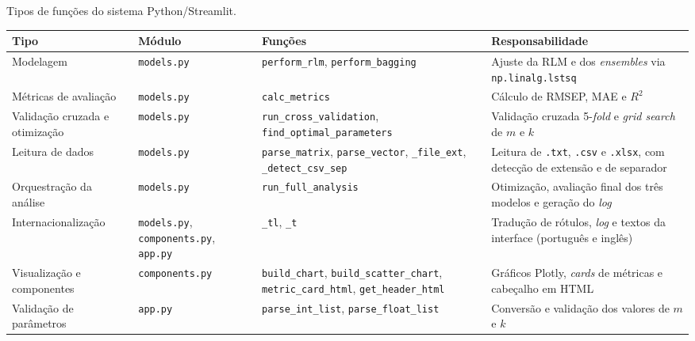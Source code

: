 \begin{quadro}[ht]
\begin{center}
\footnotesize
\captionsetup{justification=centering, labelsep=endash, width=0.75\linewidth}
\caption{Tipos de funções do sistema Python/Streamlit.}
\label{tab:tipos_python}
\begin{threeparttable}
\renewcommand{\arraystretch}{1.15}
\begin{tabularx}{\textwidth}{|>{\raggedright\arraybackslash}p{2.8cm}|>{\raggedright\arraybackslash}p{2.4cm}|>{\raggedright\arraybackslash}X|>{\raggedright\arraybackslash}X|}
\hline
\textbf{Tipo} & \textbf{Módulo} & \textbf{Funções} & \textbf{Responsabilidade} \\ \hline
Modelagem & \texttt{models.py} & \texttt{perform\_rlm}, \texttt{perform\_bagging} & Ajuste da RLM e dos \textit{ensembles} via \texttt{np.linalg.lstsq} \\ \hline
Métricas de avaliação & \texttt{models.py} & \texttt{calc\_metrics} & Cálculo de RMSEP, MAE e $R^2$ \\ \hline
Validação cruzada e otimização & \texttt{models.py} & \texttt{run\_cross\_validation}, \texttt{find\_optimal\_parameters} & Validação cruzada 5-\textit{fold} e \textit{grid search} de $m$ e $k$ \\ \hline
Leitura de dados & \texttt{models.py} & \texttt{parse\_matrix}, \texttt{parse\_vector}, \texttt{\_file\_ext}, \texttt{\_detect\_csv\_sep} & Leitura de \texttt{.txt}, \texttt{.csv} e \texttt{.xlsx}, com detecção de extensão e de separador \\ \hline
Orquestração da análise & \texttt{models.py} & \texttt{run\_full\_analysis} & Otimização, avaliação final dos três modelos e geração do \textit{log} \\ \hline
Internacionalização & \texttt{models.py}, \texttt{components.py}, \texttt{app.py} & \texttt{\_tl}, \texttt{\_t} & Tradução de rótulos, \textit{log} e textos da interface (português e inglês) \\ \hline
Visualização e componentes & \texttt{components.py} & \texttt{build\_chart}, \texttt{build\_scatter\_chart}, \texttt{metric\_card\_html}, \texttt{get\_header\_html} & Gráficos Plotly, \textit{cards} de métricas e cabeçalho em HTML \\ \hline
Validação de parâmetros & \texttt{app.py} & \texttt{parse\_int\_list}, \texttt{parse\_float\_list} & Conversão e validação dos valores de $m$ e $k$ \\ \hline

\end{tabularx}
\end{threeparttable}
\end{center}
\end{quadro}

